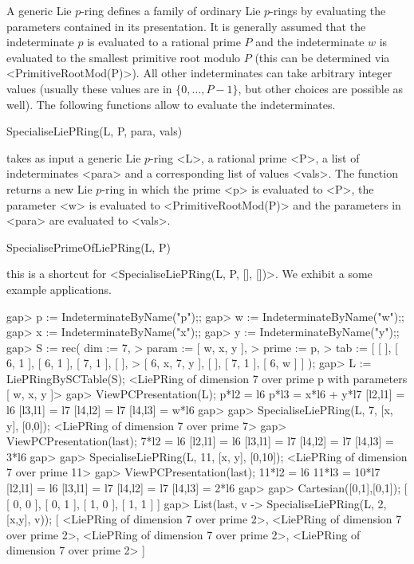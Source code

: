 
A generic Lie $p$-ring defines a family of ordinary Lie $p$-rings by 
evaluating the parameters contained in its presentation. It is generally 
assumed that the indeterminate $p$ is evaluated to a rational prime $P$ 
and the indeterminate $w$ is evaluated to the smallest primitive root 
modulo $P$ (this can be determined via <PrimitiveRootMod(P)>). All other 
indeterminates can take arbitrary integer values (usually these values are
in $\{0, \ldots, P-1\}$, but other choices are possible as well). The 
following functions allow to evaluate the indeterminates.

\> SpecialiseLiePRing(L, P, para, vals)

takes as input a generic Lie $p$-ring <L>, a rational prime <P>, 
a list of indeterminates <para> and a corresponding list of values
<vals>. The function returns a new Lie $p$-ring in which the prime 
<p> is evaluated to <P>, the parameter <w> is evaluated to 
<PrimitiveRootMod(P)> and the parameters in <para> are evaluated
to <vals>. 

\> SpecialisePrimeOfLiePRing(L, P)

this is a shortcut for <SpecialiseLiePRing(L, P, [], [])>. We exhibit
a some example applications.

\beginexample
gap> p := IndeterminateByName("p");;
gap> w := IndeterminateByName("w");;
gap> x := IndeterminateByName("x");;
gap> y := IndeterminateByName("y");;
gap> S := rec( dim := 7, 
>              param := [ w, x, y ], 
>              prime := p, 
>              tab := [ [  ], [ 6, 1 ], [ 6, 1 ], [ 7, 1 ], [  ], 
>                       [ 6, x, 7, y ], [  ], [ 7, 1 ], [ 6, w ] ] );
gap> L := LiePRingBySCTable(S);
<LiePRing of dimension 7 over prime p with parameters [ w, x, y ]>
gap> ViewPCPresentation(L);
p*l2 = l6
p*l3 = x*l6 + y*l7
[l2,l1] = l6
[l3,l1] = l7
[l4,l2] = l7
[l4,l3] = w*l6
gap> 
gap> SpecialiseLiePRing(L, 7, [x, y], [0,0]);
<LiePRing of dimension 7 over prime 7>
gap> ViewPCPresentation(last);
7*l2 = l6
[l2,l1] = l6
[l3,l1] = l7
[l4,l2] = l7
[l4,l3] = 3*l6
gap>
gap> SpecialiseLiePRing(L, 11, [x, y], [0,10]);
<LiePRing of dimension 7 over prime 11>
gap> ViewPCPresentation(last);
11*l2 = l6
11*l3 = 10*l7
[l2,l1] = l6
[l3,l1] = l7
[l4,l2] = l7
[l4,l3] = 2*l6
gap>
gap> Cartesian([0,1],[0,1]);
[ [ 0, 0 ], [ 0, 1 ], [ 1, 0 ], [ 1, 1 ] ]
gap> List(last, v -> SpecialiseLiePRing(L, 2, [x,y], v));
[ <LiePRing of dimension 7 over prime 2>, 
  <LiePRing of dimension 7 over prime 2>, 
  <LiePRing of dimension 7 over prime 2>, 
  <LiePRing of dimension 7 over prime 2> ]
\endexample

